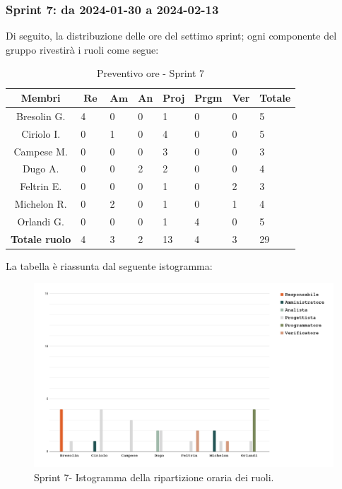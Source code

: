 \documentclass[10pt, a4paper]{article}
\begin{document}
\subsubsection{Sprint 7: da 2024-01-30 a 2024-02-13}
Di seguito, la distribuzione delle ore del settimo sprint; ogni componente del gruppo rivestirà i ruoli come segue:
\begin{table}[H]
\begin{tabularx}{\textwidth}{c|X|X|X|X|X|X|X}
    \textbf{Membri} & $\operatorname{\textbf{Re}}$ & $\mathrm{\textbf{Am}}$ & \textbf{An} & \textbf{Proj} & \textbf{Prgm} & \textbf{Ver} & \textbf{Totale} \\
        \hline Bresolin G. & \cellcolor{primarycolor}4 & 0 & 0 & 1 & 0 & 0 & 5 \\
        \hline Ciriolo I.  & 0 & 1 & 0 & \cellcolor{primarycolor}4 & 0 & 0 & 5 \\
        \hline Campese M.  & 0 & 0 & 0 & \cellcolor{primarycolor}3 & 0 & 0 & 3 \\
        \hline Dugo A.     & 0 & 0 & \cellcolor{primarycolor}2 & 2 & 0 & 0 & 4 \\
        \hline Feltrin E.  & 0 & 0 & 0 & 1 & 0 & \cellcolor{primarycolor}2 & 3 \\
        \hline Michelon R. & 0 & \cellcolor{primarycolor}2 & 0 & 1 & 0 & 1 & 4 \\
        \hline Orlandi G.  & 0 & 0 & 0 & 1 & \cellcolor{primarycolor}4 & 0 & 5 \\
        \hline
        \textbf{Totale ruolo} & 4 & 3 & 2 & 13 & 4 & 3 & 29 
    \end{tabularx}
    \caption{Preventivo ore - Sprint 7}
    \end{table}

La tabella è riassunta dal seguente istogramma:
 \begin{figure}[H]
        \centering        
        \includegraphics[width=15.5cm]{istogrammi/istogramma_7_periodo.png}
        \caption{Sprint 7- Istogramma della ripartizione oraria dei ruoli. }
    \end{figure}
\end{document}

